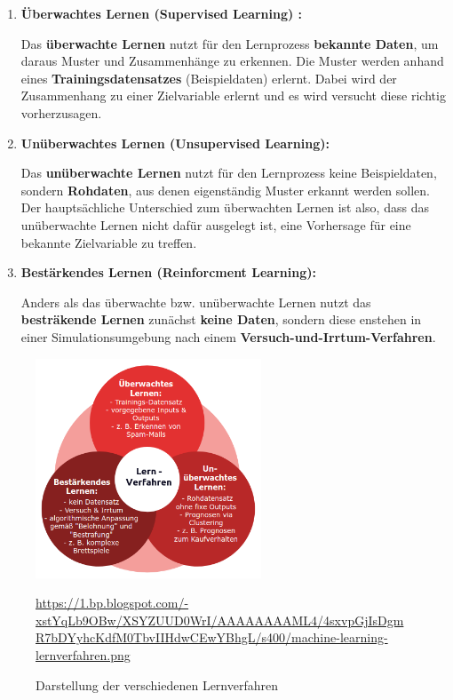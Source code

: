 \begin{enumerate}
	\item \textbf{Überwachtes Lernen (Supervised Learning) :}
	
	Das \textbf{überwachte Lernen} nutzt für den Lernprozess \textbf{bekannte Daten}, um daraus Muster und Zusammenhänge zu erkennen. Die Muster werden  anhand eines \textbf{Trainingsdatensatzes} (Beispieldaten) erlernt. Dabei wird der Zusammenhang zu einer Zielvariable erlernt und es wird versucht diese richtig vorherzusagen. \cite{datasolut3}
	
	\item \textbf{Unüberwachtes Lernen (Unsupervised Learning):}
	
	Das \textbf{unüberwachte Lernen} nutzt für den Lernprozess keine Beispieldaten, sondern \textbf{Rohdaten}, aus denen eigenständig Muster erkannt werden sollen. \\
	Der hauptsächliche Unterschied zum überwachten Lernen ist also, dass das unüberwachte Lernen nicht dafür ausgelegt ist, eine Vorhersage für eine bekannte Zielvariable zu treffen. \cite{datasolut3}
	
	\item \textbf{Bestärkendes Lernen (Reinforcment Learning):}
	
	Anders als das überwachte bzw. unüberwachte Lernen nutzt das \textbf{besträkende Lernen} zunächst \textbf{keine Daten}, sondern diese enstehen in einer Simulationsumgebung nach einem \textbf{Versuch-und-Irrtum-Verfahren}. \cite{der-onliner_blogspot}
\end{enumerate} 

\begin{figure}[H]
	\centering
	\includegraphics[width=0.6\textwidth]{kapitel3/images/lernverfahren.png}
	\label{fig:machine-learning-algorithms}
	\caption{Darstellung der verschiedenen Lernverfahren}
	\vspace{0.2cm}
	\quelle\url{https://1.bp.blogspot.com/-xstYqLb9OBw/XSYZUUD0WrI/AAAAAAAAML4/4sxvpGjIsDgmR7bDYyhcKdfM0TbvIIHdwCEwYBhgL/s400/machine-learning-lernverfahren.png}
\end{figure}

